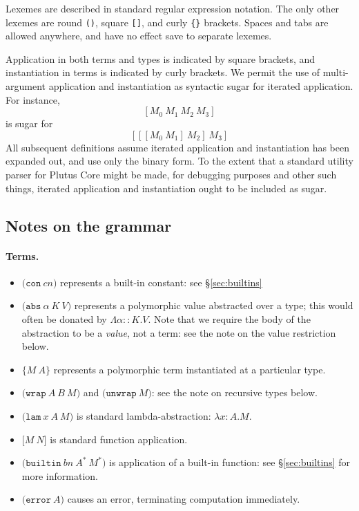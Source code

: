 \documentclass[a4paper]{article}
\newcommand{\keyword}[1]{\texttt{#1}}
\newcommand{\construct}[1]{\texttt{(} #1 \texttt{)}}
\newcommand{\con}[1]{\construct{\keyword{con} ~ #1}}
\newcommand{\abs}[3]{\construct{\keyword{abs} ~ #1 ~ #2 ~ #3}}
\newcommand{\inst}[2]{\texttt{\{}#1 ~ #2\texttt{\}}}
\newcommand{\lam}[3]{\construct{\keyword{lam} ~ #1 ~ #2 ~ #3}}
\newcommand{\app}[2]{\texttt{[} #1 ~ #2 \texttt{]}}
\newcommand{\wrap}[3]{\construct{\keyword{wrap} ~ #1 ~ #2 ~ #3}}
\newcommand{\unwrap}[1]{\construct{\keyword{unwrap} ~ #1}}
\newcommand{\builtin}[3]{\construct{\keyword{builtin} ~ #1 ~ #2 ~ #3}}
\newcommand{\error}[1]{\construct{\keyword{error} ~ #1}}
\newcommand{\appT}[2]{\texttt{[} #1 ~ #2 \texttt{]}}
\begin{document}
Lexemes are described in standard regular expression notation.  The only other
lexemes are round \texttt{()}, square \texttt{[]}, and curly \texttt{\{\}}
brackets.  Spaces and tabs are allowed anywhere, and have no effect
save to separate lexemes.

Application in both terms and types is indicated by square
brackets, and instantiation in terms is indicated by curly brackets. We
permit the use of multi-argument application and instantiation as
syntactic sugar for iterated application.
For instance,
\[
  [M_0 ~ M_1 ~ M_2 ~ M_3]
\]
is sugar for
\[
  [[[M_0 ~ M_1] ~ M_2] ~ M_3]
\]
All subsequent definitions assume iterated application and instantiation
has been expanded out, and use only the binary form. To the extent that
a standard utility parser for Plutus Core might be made, for debugging
purposes and other such things, iterated application and instantiation
ought to be included as sugar.






\newcommand\fixtype[1]{\mu\,\alpha.#1}  %

\subsection{Notes on the grammar}
\paragraph{Terms.}
\begin{itemize}
\item $\con{cn}$ represents a built-in constant: see \S\ref{sec:builtins}
\item $\abs{\alpha}{K}{V}$ represents a polymorphic value abstracted
  over a type; this would often be donated by $\Lambda\alpha{::}K.V$.
  Note that we require the body of the abstraction to be a
  \textit{value}, not a term: see the note on the value restriction below.
\item $\inst{M}{A}$ represents a polymorphic term instantiated at a particular type.
\item $\wrap{A}{B}{M}$ and $\unwrap{M}$: see the note on recursive types below.
\item $\lam{x}{A}{M}$ is standard lambda-abstraction: $\lambda{}x{:}{A}.{M}$.
\item $\app{M}{N}$ is standard function application.
\item $\builtin{bn}{A^*}{M^*}$ is application of a built-in function: see \S\ref{sec:builtins} for more information.
\item $\error{A}$ causes an error, terminating computation immediately.
\end{itemize}
\end{document}
